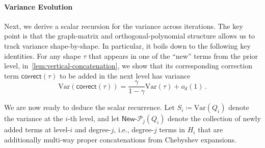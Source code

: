 \documentclass[12pt]{article}
\newcommand{\Var}{\mathrm{Var}}
\newcommand{\gam}{\gamma}
\newcommand{\corr}{\mathsf{correct}}
\newcommand{\Authornote}[3]{{\sf\footnotesize\color{#3}{[#1: #2]}}}
\newcommand{\Authornote}[3]{}
\newcommand{\jnote}[1]{\Authornote{Jeff}{#1}{blue}}
\begin{document}
 \paragraph{Variance Evolution} 
Next, we derive a scalar recursion for the variance across iterations. The key point is that the graph-matrix and orthogonal-polynomial structure allows us to track variance shape-by-shape. In particular, it boils down to the following key identities. For any shape $\tau$ that appears in one of the ``new'' terms from the prior level, in~\cref{lem:vertical-concatenation}, we show that its corresponding correction term $\corr(\tau)$ to be added in the next level has variance \[ 
\Var(\corr(\tau)) =  \frac{\gamma}{1-\gamma} \Var(\tau) +o_d(1)\,. \]

We are now ready to deduce the scalar recurrence. Let $S_i \coloneqq \Var(Q_i)$ denote the variance at the $i$-th level, and let \(\textsf{New-}\mathcal P_j(Q_i)\) denote the collection of newly added terms at level-$i$ and degree-$j$, i.e., degree-$j$ terms in $H_i$ that are additionally multi-way proper concatenations from Chebyshev expansions.%
%
%
%
\end{document}
